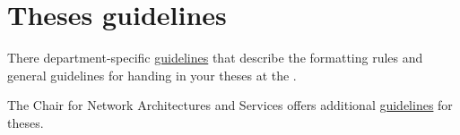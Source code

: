 \chapter{Theses guidelines}
\label{chap:guidelines}

There department-specific \href{https://www.in.tum.de/en/current-students/administrative-matters/thesis-guidelines-and-topics/}{\textcolor{TUMBlue}{guidelines}} that describe the formatting rules and general guidelines for handing in your theses at the \INname.

The Chair for Network Architectures and Services offers additional \href{https://net.in.tum.de/theses/guidelines.pdf}{\textcolor{TUMBlue}{guidelines}} for theses.
